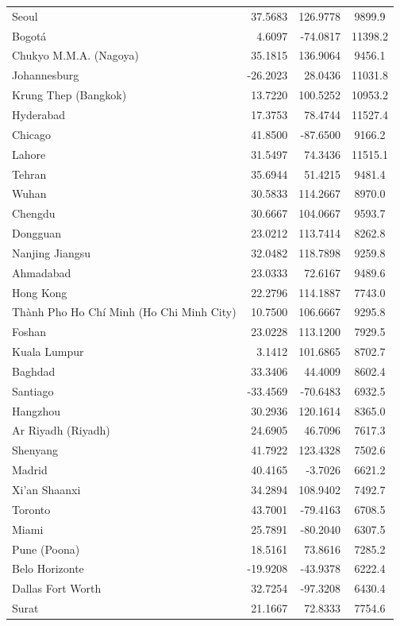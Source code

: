 \begin{longtable}{lrrc}
Seoul & 37.5683 & 126.9778 & 9899.9 \\
Bogotá & 4.6097 & -74.0817 & 11398.2 \\
Chukyo M.M.A. (Nagoya) & 35.1815 & 136.9064 & 9456.1 \\
Johannesburg & -26.2023 & 28.0436 & 11031.8 \\
Krung Thep (Bangkok) & 13.7220 & 100.5252 & 10953.2 \\
Hyderabad & 17.3753 & 78.4744 & 11527.4 \\
Chicago & 41.8500 & -87.6500 & 9166.2 \\
Lahore & 31.5497 & 74.3436 & 11515.1 \\
Tehran & 35.6944 & 51.4215 & 9481.4 \\
Wuhan & 30.5833 & 114.2667 & 8970.0 \\
Chengdu & 30.6667 & 104.0667 & 9593.7 \\
Dongguan & 23.0212 & 113.7414 & 8262.8 \\
Nanjing  Jiangsu & 32.0482 & 118.7898 & 9259.8 \\
Ahmadabad & 23.0333 & 72.6167 & 9489.6 \\
Hong Kong & 22.2796 & 114.1887 & 7743.0 \\
Thành Pho Ho Chí Minh (Ho Chi Minh City) & 10.7500 & 106.6667 & 9295.8 \\
Foshan & 23.0228 & 113.1200 & 7929.5 \\
Kuala Lumpur & 3.1412 & 101.6865 & 8702.7 \\
Baghdad & 33.3406 & 44.4009 & 8602.4 \\
Santiago & -33.4569 & -70.6483 & 6932.5 \\
Hangzhou & 30.2936 & 120.1614 & 8365.0 \\
Ar Riyadh (Riyadh) & 24.6905 & 46.7096 & 7617.3 \\
Shenyang & 41.7922 & 123.4328 & 7502.6 \\
Madrid & 40.4165 & -3.7026 & 6621.2 \\
Xi'an  Shaanxi & 34.2894 & 108.9402 & 7492.7 \\
Toronto & 43.7001 & -79.4163 & 6708.5 \\
Miami & 25.7891 & -80.2040 & 6307.5 \\
Pune (Poona) & 18.5161 & 73.8616 & 7285.2 \\
Belo Horizonte & -19.9208 & -43.9378 & 6222.4 \\
Dallas Fort Worth & 32.7254 & -97.3208 & 6430.4 \\
Surat & 21.1667 & 72.8333 & 7754.6 \\

\end{longtable}

